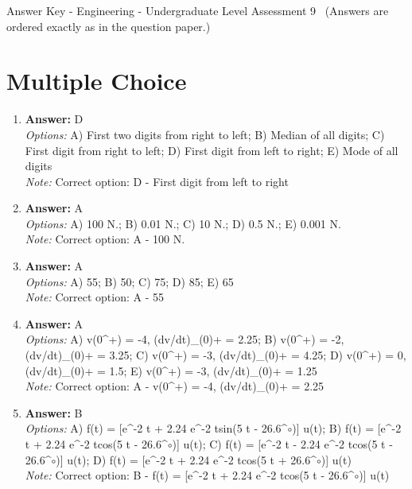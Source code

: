 \documentclass[12pt]{article}
\begin{document}
\begin{center}
Answer Key - Engineering - Undergraduate Level Assessment 9 \
\small (Answers are ordered exactly as in the question paper.)
\end{center}

\section*{Multiple Choice}
\begin{enumerate}[label=\arabic*.]
\item \textbf{Answer:} D
\\ \textit{Options:} A) First two digits from right to left; B) Median of all digits; C) First digit from right to left; D) First digit from left to right; E) Mode of all digits
\\ \textit{Note:} Correct option: D - First digit from left to right
\item \textbf{Answer:} A
\\ \textit{Options:} A) 100 N.; B) 0.01 N.; C) 10 N.; D) 0.5 N.; E) 0.001 N.
\\ \textit{Note:} Correct option: A - 100 N.
\item \textbf{Answer:} A
\\ \textit{Options:} A) 55; B) 50; C) 75; D) 85; E) 65
\\ \textit{Note:} Correct option: A - 55
\item \textbf{Answer:} A
\\ \textit{Options:} A) v(0^+) = -4, (dv/dt)\_(0)+ = 2.25; B) v(0^+) = -2, (dv/dt)\_(0)+ = 3.25; C) v(0^+) = -3, (dv/dt)\_(0)+ = 4.25; D) v(0^+) = 0, (dv/dt)\_(0)+ = 1.5; E) v(0^+) = -3, (dv/dt)\_(0)+ = 1.25
\\ \textit{Note:} Correct option: A - v(0^+) = -4, (dv/dt)\_(0)+ = 2.25
\item \textbf{Answer:} B
\\ \textit{Options:} A) f(t) = [e^-2 t + 2.24 e^-2 tsin(5 t - 26.6^\ensuremath{\circ})] u(t); B) f(t) = [e^-2 t + 2.24 e^-2 tcos(5 t - 26.6^\ensuremath{\circ})] u(t); C) f(t) = [e^-2 t - 2.24 e^-2 tcos(5 t - 26.6^\ensuremath{\circ})] u(t); D) f(t) = [e^-2 t + 2.24 e^-2 tcos(5 t + 26.6^\ensuremath{\circ})] u(t)
\\ \textit{Note:} Correct option: B - f(t) = [e^-2 t + 2.24 e^-2 tcos(5 t - 26.6^\ensuremath{\circ})] u(t)
\end{enumerate}
\end{document}

